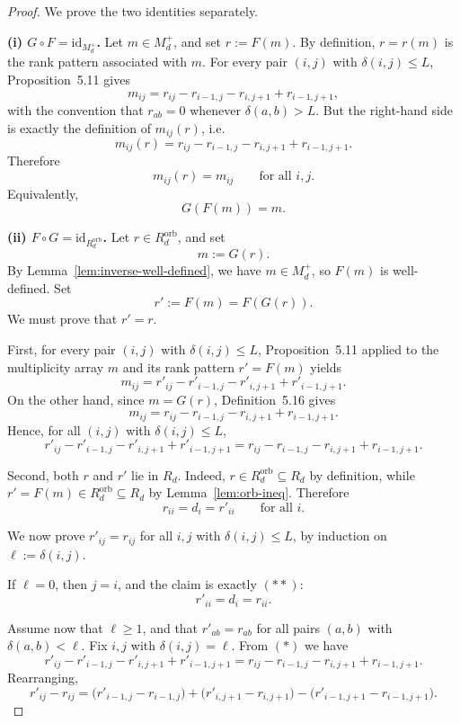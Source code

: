 \documentclass{article}
\theoremstyle{definition}
\begin{document}
\begin{proof}\label{proof:F-G-inverse}
We prove the two identities separately.

\smallskip
\noindent
\textbf{(i) \(G\circ F=\mathrm{id}_{M_d^+}\).}
Let \(m\in M_d^+\), and set \(r:=F(m)\). By definition, \(r=r(m)\) is the rank pattern
associated with \(m\). For every pair \((i,j)\) with \(\delta(i,j)\le L\), Proposition~5.11 gives
\[
m_{ij}
=
r_{ij}-r_{i-1,j}-r_{i,j+1}+r_{i-1,j+1},
\]
with the convention that \(r_{ab}=0\) whenever \(\delta(a,b)>L\).
But the right-hand side is exactly the definition of \(m_{ij}(r)\), i.e.
\[
m_{ij}(r)=r_{ij}-r_{i-1,j}-r_{i,j+1}+r_{i-1,j+1}.
\]
Therefore
\[
m_{ij}(r)=m_{ij}
\qquad\text{for all }i,j.
\]
Equivalently,
\[
G(F(m))=m.
\]

\smallskip
\noindent
\textbf{(ii) \(F\circ G=\mathrm{id}_{R_d^{\mathrm{orb}}}\).}
Let \(r\in R_d^{\mathrm{orb}}\), and set
\[
m:=G(r).
\]
By Lemma~\ref{lem:inverse-well-defined}, we have \(m\in M_d^+\), so \(F(m)\) is well-defined.
Set
\[
r':=F(m)=F(G(r)).
\]
We must prove that \(r'=r\).

First, for every pair \((i,j)\) with \(\delta(i,j)\le L\), Proposition~5.11 applied to the multiplicity
array \(m\) and its rank pattern \(r'=F(m)\) yields
\[
m_{ij}
=
r'_{ij}-r'_{i-1,j}-r'_{i,j+1}+r'_{i-1,j+1}.
\]
On the other hand, since \(m=G(r)\), Definition~5.16 gives
\[
m_{ij}
=
r_{ij}-r_{i-1,j}-r_{i,j+1}+r_{i-1,j+1}.
\]
Hence, for all \((i,j)\) with \(\delta(i,j)\le L\),
\[
r'_{ij}-r'_{i-1,j}-r'_{i,j+1}+r'_{i-1,j+1}
=
r_{ij}-r_{i-1,j}-r_{i,j+1}+r_{i-1,j+1}.
\tag{*}
\]

Second, both \(r\) and \(r'\) lie in \(R_d\). Indeed, \(r\in R_d^{\mathrm{orb}}\subseteq R_d\) by definition,
while \(r'=F(m)\in R_d^{\mathrm{orb}}\subseteq R_d\) by Lemma~\ref{lem:orb-ineq}. Therefore
\[
r_{ii}=d_i=r'_{ii}
\qquad\text{for all }i.
\tag{**}
\]

We now prove \(r'_{ij}=r_{ij}\) for all \(i,j\) with \(\delta(i,j)\le L\), by induction on
\(\ell:=\delta(i,j)\).

If \(\ell=0\), then \(j=i\), and the claim is exactly \((**)\):
\[
r'_{ii}=d_i=r_{ii}.
\]

Assume now that \(\ell\ge 1\), and that \(r'_{ab}=r_{ab}\) for all pairs \((a,b)\) with
\(\delta(a,b)<\ell\). Fix \(i,j\) with \(\delta(i,j)=\ell\).
From \((*)\) we have
\[
r'_{ij}-r'_{i-1,j}-r'_{i,j+1}+r'_{i-1,j+1}
=
r_{ij}-r_{i-1,j}-r_{i,j+1}+r_{i-1,j+1}.
\]
Rearranging,
\[
r'_{ij}-r_{ij}
=
\bigl(r'_{i-1,j}-r_{i-1,j}\bigr)
+
\bigl(r'_{i,j+1}-r_{i,j+1}\bigr)
-
\bigl(r'_{i-1,j+1}-r_{i-1,j+1}\bigr).
\tag{***}
\]


\end{proof}
\end{document}
